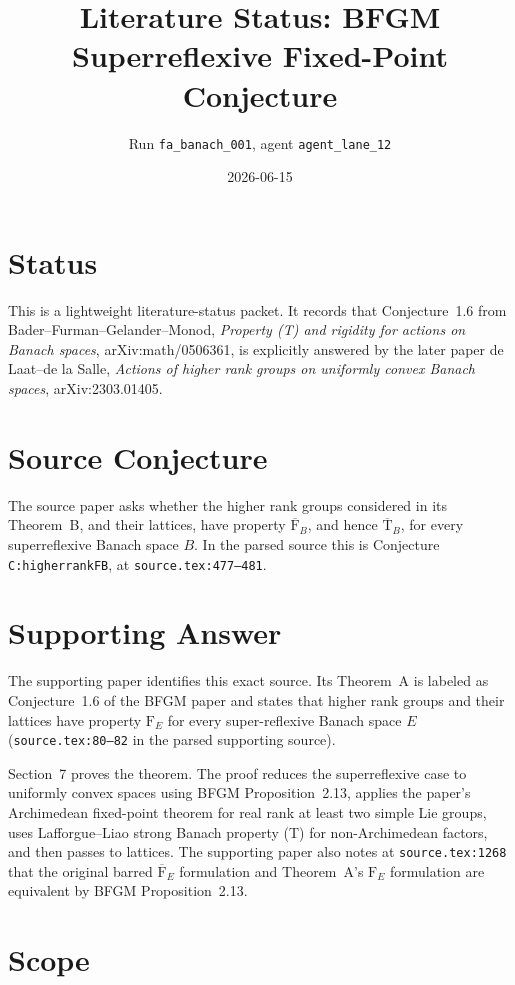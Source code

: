 \documentclass[11pt]{article}
\title{Literature Status: BFGM Superreflexive Fixed-Point Conjecture}
\author{Run \texttt{fa\_banach\_001}, agent \texttt{agent\_lane\_12}}
\date{2026-06-15}
\newcommand{\Fb}{\overline{\mathrm{F}}_B}
\newcommand{\Tb}{\overline{\mathrm{T}}_B}
\newcommand{\FE}{\mathrm{F}_E}
\begin{document}
\maketitle

\section*{Status}

This is a lightweight literature-status packet. It records that Conjecture~1.6
from Bader--Furman--Gelander--Monod, \emph{Property (T) and rigidity for
actions on Banach spaces}, arXiv:math/0506361, is explicitly answered by the
later paper de Laat--de la Salle, \emph{Actions of higher rank groups on
uniformly convex Banach spaces}, arXiv:2303.01405.

\section*{Source Conjecture}

The source paper asks whether the higher rank groups considered in its
Theorem~B, and their lattices, have property $\Fb$, and hence $\Tb$, for every
superreflexive Banach space $B$. In the parsed source this is Conjecture
\texttt{C:higherrankFB}, at \texttt{source.tex:477--481}.

\section*{Supporting Answer}

The supporting paper identifies this exact source. Its Theorem~A is labeled
as Conjecture~1.6 of the BFGM paper and states that higher rank groups and
their lattices have property $\FE$ for every super-reflexive Banach space $E$
(\texttt{source.tex:80--82} in the parsed supporting source).

Section~7 proves the theorem. The proof reduces the superreflexive case to
uniformly convex spaces using BFGM Proposition~2.13, applies the paper's
Archimedean fixed-point theorem for real rank at least two simple Lie groups,
uses Lafforgue--Liao strong Banach property (T) for non-Archimedean factors,
and then passes to lattices. The supporting paper also notes at
\texttt{source.tex:1268} that the original barred $\overline{\mathrm{F}}_E$
formulation and Theorem~A's $\FE$ formulation are equivalent by BFGM
Proposition~2.13.

\section*{Scope}
\end{document}
